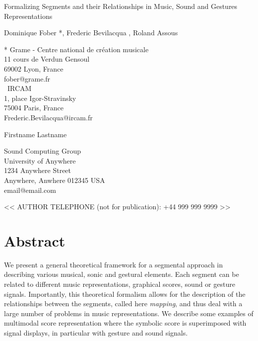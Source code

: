 \documentclass[letterpaper, 12pt]{article}
\begin{document}
\ifdefined \mamversion

  

    


\fi

\ifdefined \cmjversion

{\cmjTitle Formalizing Segments and their Relationships in Music, Sound and Gestures Representations}
\vspace*{24pt}

\ifdefined \finalversion
{\cmjAuthor Dominique Fober *, Frederic Bevilacqua \dag, Roland Assous \ddag}
\newline
\begin{cmjAuthorAddress}
	* Grame - Centre national de cr\'eation musicale\\
	11 cours de Verdun Gensoul\\
	69002 Lyon, France\\
	fober@grame.fr \\
	\dag\ IRCAM \\
	1, place Igor-Stravinsky\\
	75004 Paris, France \\
	Frederic.Bevilacqua@ircam.fr
\end{cmjAuthorAddress}

\else
{\cmjAuthor Firstname Lastname}
\newline
\begin{cmjAuthorAddress}
	Sound Computing Group\\
	University of Anywhere\\
	1234 Anywhere Street\\
	Anywhere, Anwhere 012345 USA\\
	email@email.com
\end{cmjAuthorAddress}

\vspace*{24pt}
{\cmjAuthorPhone << AUTHOR TELEPHONE (not for publication): +44 999 999 9999 >>}

\fi
\vspace*{24pt}

\section*{Abstract}
We present a general theoretical framework for a segmental approach in describing various musical, sonic and gestural elements.  Each segment can be related to different music representations, graphical scores, sound or gesture signals. Importantly, this theoretical formalism allows for the description of the relationships between the segments, called here \emph{mapping}, and thus deal with a large number of problems in music representations. We describe some examples of multimodal score representation where the symbolic score is superimposed with signal displays, in particular with gesture and sound signals.
\end{document}
